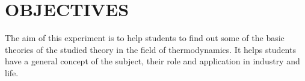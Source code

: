 \section{OBJECTIVES}
The aim of this experiment is to help students to find out some of the basic theories of the studied theory in the field of thermodynamics.
It helps students have a general concept of the subject, their role and application in industry and life.
